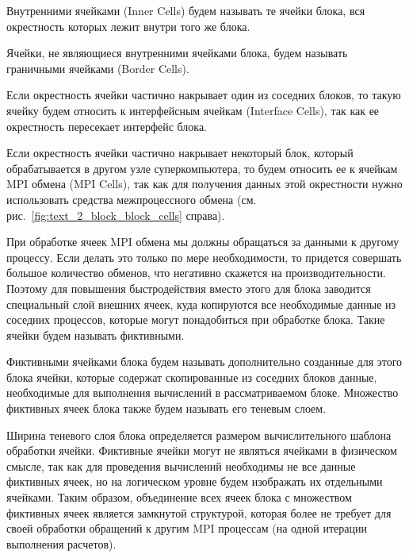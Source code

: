 \begin{definition}
Внутренними ячейками\label{term:cell_block_inner} (Inner Cells) будем называть те ячейки блока, вся окрестность которых лежит внутри того же блока.
\end{definition}

\begin{definition}
Ячейки, не являющиеся внутренними ячейками блока, будем называть граничными ячейками\label{term:cell_block_border} (Border Cells).
\end{definition}

\begin{definition}
Если окрестность ячейки частично накрывает один из соседних блоков, то такую ячейку будем относить к интерфейсным ячейкам\label{term:cell_block_interface} (Interface Cells), так как ее окрестность пересекает интерфейс блока.
\end{definition}

\begin{definition}
Если окрестность ячейки частично накрывает некоторый блок, который обрабатывается в другом узле суперкомпьютера, то будем относить ее к ячейкам MPI обмена (MPI Cells)\label{term:cell_block_mpi}, так как для получения данных этой окрестности нужно использовать средства межпроцессного обмена (см. рис.~\ref{fig:text_2_block_block_cells} справа).
\end{definition}

При обработке ячеек MPI обмена мы должны обращаться за данными к другому процессу.
Если делать это только по мере необходимости, то придется совершать большое количество обменов, что негативно скажется на производительности.
Поэтому для повышения быстродействия вместо этого для блока заводится специальный слой внешних ячеек, куда копируются все необходимые данные из соседних процессов, которые могут понадобиться при обработке блока.
Такие ячейки будем называть фиктивными\label{term:cell_block_ghost}.

\begin{definition}
Фиктивными ячейками блока будем называть дополнительно созданные для этого блока ячейки, которые содержат скопированные из соседних блоков данные, необходимые для выполнения вычислений в рассматриваемом блоке.
Множество фиктивных ячеек блока также будем называть его теневым слоем\label{term:block_shadow_layer}.
\end{definition}

Ширина теневого слоя блока определяется размером вычислительного шаблона обработки ячейки.
Фиктивные ячейки могут не являться ячейками в физическом смысле, так как для проведения вычислений необходимы не все данные фиктивных ячеек, но на логическом уровне будем изображать их отдельными ячейками.
Таким образом, объединение всех ячеек блока с множеством фиктивных ячеек является замкнутой структурой, которая более не требует для своей обработки обращений к другим MPI процессам (на одной итерации выполнения расчетов).

